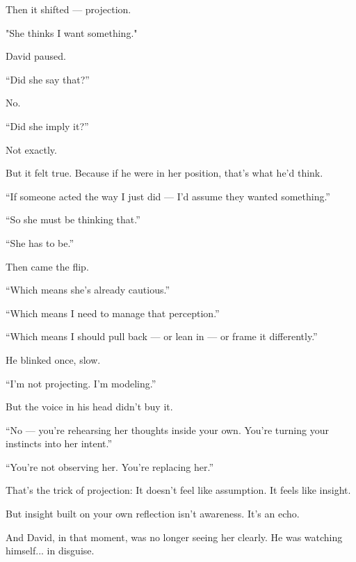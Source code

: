 Then it shifted — projection.

"She thinks I want something."

David paused.

“Did she say that?”

No.

“Did she imply it?”

Not exactly.

But it felt true.
Because if he were in her position, that’s what he’d think.

“If someone acted the way I just did — I’d assume they wanted something.”

“So she must be thinking that.”

“She has to be.”

Then came the flip.

“Which means she’s already cautious.”

“Which means I need to manage that perception.”

“Which means I should pull back — or lean in — or frame it differently.”

He blinked once, slow.

“I’m not projecting. I’m modeling.”

But the voice in his head didn’t buy it.

“No — you’re rehearsing her thoughts inside your own. You’re turning your instincts into her intent.”

“You’re not observing her. You’re replacing her.”

That’s the trick of projection:
It doesn’t feel like assumption.
It feels like insight.

But insight built on your own reflection isn’t awareness.
It’s an echo.

And David, in that moment, was no longer seeing her clearly.
He was watching himself... in disguise.

\medskip


